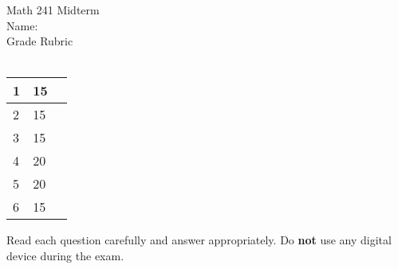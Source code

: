 \documentclass[letterpaper,11pt]{article}
\begin{document}
\begin{center}
Math 241 Midterm\\
Name: \\
\vspace{1in}
    \renewcommand{\arraystretch}{2}
    Grade Rubric \\ \ \\
    \begin{tabularx}{0.8\textwidth}{|X|X|X|}
        \hline
        1 & 15 & \\
        \hline
        2 & 15 & \\
        \hline
        3 & 15 & \\
        \hline
        4 & 20 & \\
        \hline
        5 & 20 & \\
        \hline
        6 & 15 & \\
        \hline
    \end{tabularx}
    
    \vspace{1in}
    Read each question carefully and answer appropriately. Do \textbf{not} use any digital device during the exam.
\end{center}
\newpage
\end{document}
